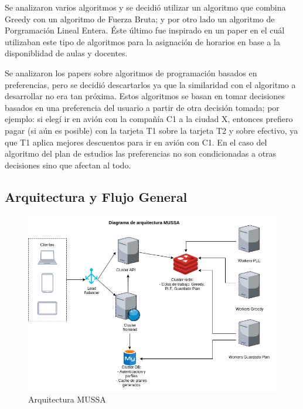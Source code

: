 \documentclass[a4paper]{article}
\begin{document}
Se analizaron varios algoritmos y se decidió utilizar un algoritmo que combina Greedy con un algoritmo de Fuerza Bruta; y por otro lado un algoritmo de Porgramación Lineal Entera. Éste último fue inspirado en un paper\cite{PLE_HORARIOS_UNIV} en el cuál utilizaban este tipo de algoritmos para la asignación de horarios en base a la disponiblidad de aulas y docentes.

Se analizaron los papers\cite{PLE_HORARIOS_UNIV, MODELOS_PLE, PAPER_ROSITA_PLANNING_WITH_PREFERENCES_1, PAPER_ROSITA_PLANNING_WITH_PREFERENCES_2, PAPER_ROSITA_PLANNING_WITH_PREFERENCES_3, PAPER_ROSITA_PLANNING_WITH_PREFERENCES_4} sobre algoritmos de programación basados en preferencias, pero se decidió descartarlos ya que la similaridad con el algoritmo a desarrollar no era tan próxima. Estos algoritmos se basan en tomar decisiones basados en una preferencia del usuario a partir de otra decisión tomada; por ejemplo: si elegí ir en avión con la compañía C1 a la ciudad X, entonces prefiero pagar (si aún es posible) con la tarjeta T1 sobre la tarjeta T2 y sobre efectivo, ya que T1 aplica mejores descuentos para ir en avión con C1. En el caso del algoritmo del plan de estudios las preferencias no son condicionadas a otras decisiones sino que afectan al todo.

\subsection{Arquitectura y Flujo General}

\begin{figure}[H]
\centering
\includegraphics[scale=0.4]{Imagenes/arquitectura.png}\par
\caption{Arquitectura MUSSA}
\end{figure}
\end{document}
